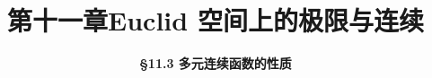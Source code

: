 \everymath{\displaystyle}



\title[第十一章\\
Euclid空间上的极限与连续]{\texorpdfstring{\LARGE \bfseries 第十一章\quad Euclid 空间上的极限与连续}{第十一章 Euclid 空间上的极限与连续}} %
\author[\S 11.3\\
多元连续函数性质] %
{\Large \bfseries \S 11.3 多元连续函数的性质}
\date{}





\begin{frame}

\titlepage %

\end{frame}






